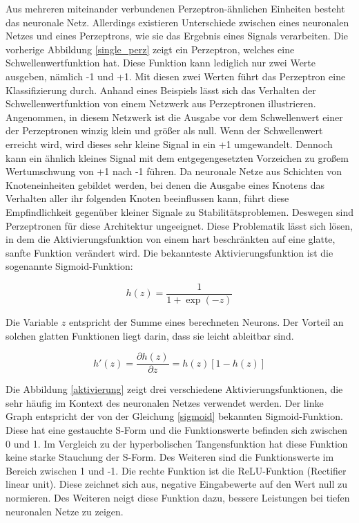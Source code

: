 Aus mehreren miteinander verbundenen Perzeptron-ähnlichen Einheiten besteht das neuronale Netz. Allerdings existieren Unterschiede zwischen eines neuronalen Netzes und eines Perzeptrons, wie sie das Ergebnis eines Signals verarbeiten. Die vorherige Abbildung \ref{single_perz} zeigt ein Perzeptron, welches eine Schwellenwertfunktion hat. Diese Funktion kann lediglich nur zwei Werte ausgeben, nämlich -1 und +1. Mit diesen zwei Werten führt das Perzeptron eine Klassifizierung durch. Anhand eines Beispiels lässt sich das Verhalten der Schwellenwertfunktion von einem Netzwerk aus Perzeptronen illustrieren. Angenommen, in diesem Netzwerk ist die Ausgabe vor dem Schwellenwert einer der Perzeptronen winzig klein und größer als null. Wenn der Schwellenwert erreicht wird, wird dieses sehr kleine Signal in ein +1 umgewandelt. Dennoch kann ein ähnlich kleines Signal mit dem entgegengesetzten Vorzeichen zu großem Wertumschwung von +1 nach -1 führen. Da neuronale Netze aus Schichten von Knoteneinheiten gebildet werden, bei denen die Ausgabe eines Knotens das Verhalten aller ihr folgenden Knoten beeinflussen kann, führt diese Empfindlichkeit gegenüber kleiner Signale zu Stabilitätsproblemen. Deswegen sind Perzeptronen für diese Architektur ungeeignet. Diese Problematik lässt sich lösen, in dem die Aktivierungsfunktion von einem hart beschränkten auf eine glatte, sanfte Funktion verändert wird\cite{Gonzalez2018}. Die bekannteste Aktivierungsfunktion ist die sogenannte Sigmoid-Funktion:

\begin{equation}
\label{sigmoid}
	h(z) = \frac{1}{1 + \exp(-z)}
\end{equation}

Die Variable $z$ entspricht der Summe eines berechneten Neurons. Der Vorteil an solchen glatten Funktionen liegt darin, dass sie leicht ableitbar sind.

\begin{equation}
\label{ableitung_sig}
	h'(z) = \frac{\partial h(z)}{\partial z} = h(z)[1 - h(z)]
\end{equation}


Die Abbildung \ref{aktivierung} zeigt drei verschiedene Aktivierungsfunktionen, die sehr häufig im Kontext des neuronalen Netzes verwendet werden. Der linke Graph entspricht der von der Gleichung \ref{sigmoid} bekannten Sigmoid-Funktion. Diese hat eine gestauchte S-Form und die Funktionswerte befinden sich zwischen 0 und 1. Im Vergleich zu der hyperbolischen Tangensfunktion hat diese Funktion keine starke Stauchung der S-Form. Des Weiteren sind die Funktionswerte im Bereich zwischen 1 und -1. Die rechte Funktion ist die ReLU-Funktion (Rectifier linear unit). Diese zeichnet sich aus, negative Eingabewerte auf den Wert null zu normieren. Des Weiteren neigt diese Funktion dazu, bessere Leistungen bei tiefen neuronalen Netze zu zeigen\cite{Gonzalez2018}.

